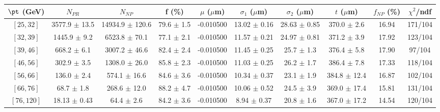 \begin{tabular}{c||c|c|c|c|c|c|c||c|c}
$\pt$ (GeV) & $N_{PR}$ & $N_{NP}$ & f (\%) & $\mu$ ($\mu$m) & $\sigma_1$ ($\mu$m) & $\sigma_2$ ($\mu$m)  & $t$ ($\mu$m) & $f_{NP}$ (\%) & $\chi^2$/ndf \\
\hline
$[25, 32]$ & 3577.9 $\pm$ 13.5 & 14934.9 $\pm$ 120.6 & 79.6 $\pm$ 1.5 & -0.010500 & 13.02 $\pm$ 0.16 & 28.63 $\pm$ 0.85 & 370.0 $\pm$ 2.6 & 16.94 & 171/104\\
$[32, 39]$ & 1445.9 $\pm$ 9.2 & 6523.8 $\pm$ 70.1 & 77.1 $\pm$ 2.1 & -0.010500 & 11.57 $\pm$ 0.21 & 24.97 $\pm$ 0.81 & 371.2 $\pm$ 3.9 & 17.92 & 123/104\\
$[39, 46]$ & 668.2 $\pm$ 6.1 & 3007.2 $\pm$ 46.6 & 82.4 $\pm$ 2.4 & -0.010500 & 11.45 $\pm$ 0.25 & 25.7 $\pm$ 1.3 & 376.4 $\pm$ 5.8 & 17.90 & 97/104\\
$[46, 56]$ & 302.9 $\pm$ 3.5 & 1308.0 $\pm$ 26.0 & 85.8 $\pm$ 2.3 & -0.010500 & 11.03 $\pm$ 0.25 & 26.2 $\pm$ 1.7 & 386.4 $\pm$ 7.8 & 17.33 & 118/104\\
$[56, 66]$ & 136.0 $\pm$ 2.4 & 574.1 $\pm$ 16.6 & 84.6 $\pm$ 3.6 & -0.010500 & 10.34 $\pm$ 0.37 & 23.1 $\pm$ 1.9 & 384.8 $\pm$ 12.4 & 16.87 & 102/104\\
$[66, 76]$ & 68.7 $\pm$ 1.8 & 268.6 $\pm$ 12.0 & 88.2 $\pm$ 4.7 & -0.010500 & 10.06 $\pm$ 0.52 & 24.5 $\pm$ 3.9 & 369.0 $\pm$ 17.4 & 15.81 & 131/104\\
$[76, 120]$ & 18.13 $\pm$ 0.43 & 64.4 $\pm$ 2.6 & 84.2 $\pm$ 3.6 & -0.010500 & 8.94 $\pm$ 0.37 & 20.8 $\pm$ 1.6 & 367.0 $\pm$ 17.2 & 14.54 & 120/104\\
\end{tabular}
